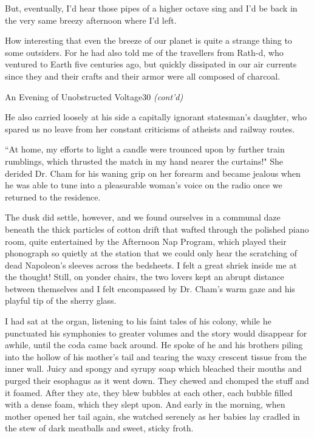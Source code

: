 \documentclass[12pt,twoside]{report}
\begin{document}
But, eventually, I'd hear those pipes of a higher octave sing and I'd
be back in the very same breezy afternoon where I'd left.

How interesting that even the breeze of our planet is quite a strange
thing to some outsiders.  For he had also told me of the travellers
from Rath-d, who ventured to Earth five centuries ago, but quickly
dissipated in our air currents since they and their crafts and their
armor were all composed of charcoal.

\pagebreak

	\begin{sidebar}{An Evening of Unobstructed Voltage}{30}
		\textit{(cont'd)}\vspace{6px}
	
		\begin{quoting}[rightmargin=0pt,leftmargin=0.5\leftmargin,font=itshape]
			He also carried loosely at his side a capitally ignorant statesman's daughter, who spared us no leave from her constant criticisms of atheists and railway routes.\vspace{6px}
			
			``At home, my efforts to light a candle were trounced upon by further train rumblings, which thrusted the match in my hand nearer the curtains!" She derided Dr. Cham for his waning grip on her forearm and became jealous when he was able to tune into a pleasurable woman’s voice on the radio once we returned to the residence.\vspace{6px}

			The dusk did settle, however, and we found ourselves in a communal daze beneath the thick particles of cotton drift that wafted through the polished piano room, quite entertained by the Afternoon Nap Program, which played their phonograph so quietly at the station that we could only hear the scratching of dead Napoleon's sleeves across the bedsheets. I felt a great shriek inside me at the thought! Still, on yonder chairs, the two lovers kept an abrupt distance between themselves and I felt encompassed by Dr. Cham's warm gaze and his playful tip of the sherry glass.
		\end{quoting}
	\end{sidebar}

I had sat at the organ, listening to his faint tales of his colony,
while he punctuated his symphonies to greater volumes and the story
would disappear for awhile, until the coda came back around. He spoke
of he and his brothers piling into the hollow of his mother's tail and
tearing the waxy crescent tissue from the inner wall.  Juicy and
spongy and syrupy soap which bleached their mouths and purged their
esophagus as it went down.  They chewed and chomped the stuff and it
foamed.  After they ate, they blew bubbles at each other, each bubble
filled with a dense foam, which they slept upon.  And early in the
morning, when mother opened her tail again, she watched serenely as
her babies lay cradled in the stew of dark meatballs and sweet, sticky
froth.
\end{document}
